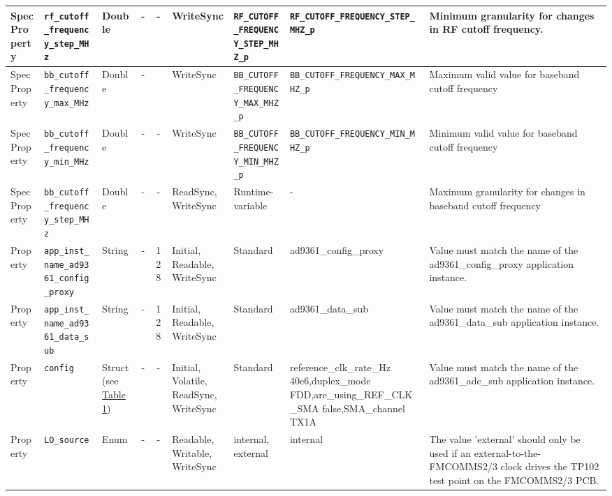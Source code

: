 \documentclass{article}
\begin{document}
\begin{landscape}
\begin{scriptsize}
\begin{longtable}{|p{1.8cm}|p{4.1cm}|p{1cm}|c|c|p{1.6cm}|p{3.7cm}|p{3.7cm}|p{2.5cm}|}
			\hline
			SpecProperty & \verb+rf_cutoff_frequency_step_MHz+ & Double& -        & -          & WriteSync      & \verb+RF_CUTOFF_FREQUENCY_STEP_MHZ_p+ & \verb+RF_CUTOFF_FREQUENCY_STEP_MHZ_p+ & Minimum granularity for changes in RF cutoff frequency. \\
			\hline
			SpecProperty & \verb+bb_cutoff_frequency_max_MHz+  & Double& -        & & WriteSync      & \verb+BB_CUTOFF_FREQUENCY_MAX_MHZ_p+ & \verb+BB_CUTOFF_FREQUENCY_MAX_MHZ_p+ & Maximum valid value for baseband cutoff frequency                                                                                                                                                                           \\
			\hline
			SpecProperty & \verb+bb_cutoff_frequency_min_MHz+  & Double& -        & -          & WriteSync      & \verb+BB_CUTOFF_FREQUENCY_MIN_MHZ_p+ & \verb+BB_CUTOFF_FREQUENCY_MIN_MHZ_p+ & Minimum valid value for baseband cutoff frequency                                                                                                                                                                           \\
			\hline
			SpecProperty & \verb+bb_cutoff_frequency_step_MHz+ & Double& -        & -          & ReadSync, WriteSync & Runtime-variable & - & Maximum granularity for changes in baseband cutoff frequency                                                                                                                                                                \\
			\hline
			Property & \verb+app_inst_name_ad9361_config_proxy+ &String& -        & 128        & Initial, Readable, WriteSync & Standard & ad9361\_config\_proxy & Value must match the name of the ad9361\_config\_proxy application instance. \\
			\hline
			Property & \verb+app_inst_name_ad9361_data_sub+ &String& -        & 128        & Initial, Readable, WriteSync & Standard & ad9361\_data\_sub & Value must match the name of the ad9361\_data\_sub application instance. \\
			\hline
			Property & \verb+config+ & Struct (see \hyperlink{tab1}{Table 1}) & -        & -        & Initial, Volatile, ReadSync, WriteSync & Standard & reference\_clk\_rate\_Hz 40e6,duplex\_mode FDD,are\_using\_REF\_CLK\_SMA false,SMA\_channel TX1A & Value must match the name of the ad9361\_adc\_sub application instance. \\
			\hline
			Property & \verb+LO_source+ &Enum& -        & -        & Readable, Writable, WriteSync & internal, external  & internal & The value 'external' should only be used if an external-to-the-FMCOMMS2/3 clock drives the TP102 test point on the FMCOMMS2/3 PCB. \\
			\hline
		\end{longtable}
	\end{scriptsize}


\end{landscape}
\end{document}
